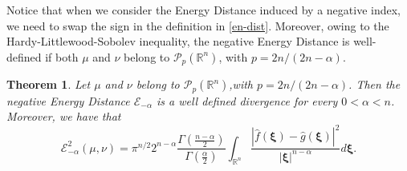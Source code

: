 \documentclass{article}
\newcommand{\bv}{\mathrm{BV}}
\newcommand{\R}{\mathbb R}
\def\R{\mathbb{R}}
\def\bv{{\bf v}}
\def\bw{{\bf w}}
\def\bxi{{\pmb\xi}}
\def \PP{\mathcal{P}}
\def \erre{\mathbb{R}}
\newtheorem{theorem}{Theorem}
\newtheorem{definition}{Definition}
\begin{document}
% 

% 
Notice that when we consider the Energy Distance induced by a negative index, we need to swap the sign in the definition in \eqref{en-dist}. 
% 
Moreover, owing to the Hardy-Littlewood-Sobolev inequality,\cite{Lieb83} the negative Energy Distance is well-defined if both $\mu$ and $\nu$ belong to $\PP_p(\erre^n)$, with $p = 2n/(2n-\alpha)$.

% 
% 

\begin{theorem}
    Let $\mu$ and $\nu$ belong to $\PP_p(\erre^n)$,with $p = 2n/(2n-\alpha)$. Then the negative Energy Distance $\mathcal{E}_{-\alpha}$ is a well defined divergence for every $0<\alpha<n$.
    Moreover, we have that 
    \begin{equation}
        \label{eq:fourier_negative_energy}
        \mathcal{E}^2_{-\alpha}(\mu,\nu)=\pi^{n/2}2^{n-\alpha} \frac{\Gamma\left(\frac{n-\alpha}2\right)}{\Gamma\left(\frac{\alpha}2\right)}\int_{\erre^n}\frac{|\hat f(\bxi)- \hat g(\bxi)|^2}{|\bxi|^{n-\alpha}} d\bxi.
    \end{equation}
\end{theorem}
\end{document}
